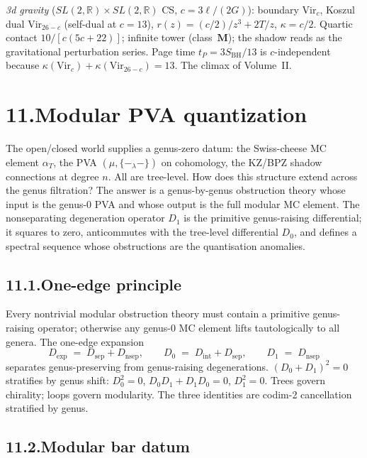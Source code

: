 \documentclass[11pt,reqno]{amsart}
\theoremstyle{definition}
\theoremstyle{remark}
\providecommand{\Vir}{\mathrm{Vir}}
\providecommand{\bR}{\mathbb{R}}
\providecommand{\sep}{\mathrm{sep}}
\providecommand{\nsep}{\mathrm{nsep}}
\numberwithin{equation}{section}
\begin{document}
\smallskip
\noindent\emph{3d gravity} ($SL(2,\bR) \times SL(2,\bR)$
CS, $c = 3\ell/(2G)$): boundary $\Vir_c$, Koszul dual
$\Vir_{26-c}$ (self-dual at $c = 13$), $r(z) = (c/2)/z^3 +
2T/z$, $\kappa = c/2$. Quartic contact
$10/[c(5c{+}22)]$; infinite tower (class~$\mathbf{M}$); the
shadow reads as the gravitational perturbation series. Page
time $t_P = 3S_{\mathrm{BH}}/13$ is $c$-independent because
$\kappa(\Vir_c) + \kappa(\Vir_{26-c}) = 13$. The climax of
Volume~II.


\section*{11.\quad Modular PVA quantization}

The open/closed world supplies a genus-zero datum: the
Swiss-cheese MC element $\alpha_T$, the PVA
$(\mu, \{-_\lambda -\})$ on cohomology, the KZ/BPZ shadow
connections at degree $n$. All are tree-level. How does this
structure extend across the genus filtration? The answer is
a genus-by-genus obstruction theory whose input is the genus-$0$
PVA and whose output is the full modular MC element. The
nonseparating degeneration operator $D_1$ is the primitive
genus-raising differential; it squares to zero, anticommutes
with the tree-level differential $D_0$, and defines a spectral
sequence whose obstructions are the quantisation anomalies.

\subsection*{11.1.\enspace One-edge principle}

Every nontrivial modular obstruction theory must contain a
primitive genus-raising operator; otherwise any genus-$0$ MC
element lifts tautologically to all genera. The one-edge
expansion
\[
D_{\exp} \;=\; D_{\sep} + D_{\nsep},
\qquad
D_0 \;=\; D_{\mathrm{int}} + D_{\sep},
\qquad
D_1 \;=\; D_{\nsep}
\]
separates genus-preserving from genus-raising degenerations.
$(D_0 + D_1)^2 = 0$ stratifies by genus shift:
$D_0^2 = 0$, $D_0 D_1 + D_1 D_0 = 0$, $D_1^2 = 0$. Trees
govern chirality; loops govern modularity. The three
identities are codim-2 cancellation stratified by genus.

\subsection*{11.2.\enspace Modular bar datum}
\end{document}
